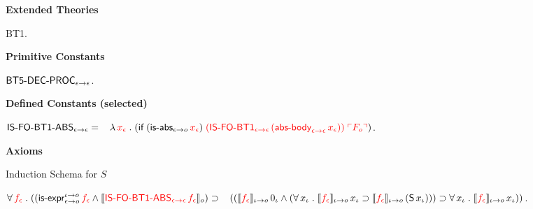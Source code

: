 \begin{biformthy}\em

\bi

  \item[]

  \item[] \textbf{Extended Theories} 

  \be

    \setcounter{enumi}{0}

    \item BT1.

  \ee

  \item[] \textbf{Primitive Constants}

  \be

    \setcounter{enumi}{6}

    \item $\mbox{\sf BT5-DEC-PROC}_{\epsilon \rightarrow \epsilon}$.

  \ee

  \item[] \textbf{Defined Constants (selected)}

  \be

    \setcounter{enumi}{5}

    \item $\mbox{\sf IS-FO-BT1-ABS}_{\epsilon \rightarrow \epsilon} = {}\\
    \hspace*{2ex}\lambda\, \textcolor{red}{x_\epsilon} \mathrel. 
    (\mbox{\sf if} \; (\mbox{\sf is-abs}_{\epsilon \rightarrow o} \, \textcolor{red}{x_\epsilon}) \;
    \textcolor{red}{(\mbox{\sf IS-FO-BT1}_{\epsilon \rightarrow \epsilon} \,
    (\mbox{\sf abs-body}_{\epsilon \rightarrow \epsilon} \, x_\epsilon))} \;
    \textcolor{red}{\ulcorner F_o\urcorner})$.

  \ee

  \item[] \textbf{Axioms}

  \be

    \setcounter{enumi}{26}

    \item Induction Schema for $S$

    $\forall\, \textcolor{red}{f_\epsilon} \mathrel. 
    ((\mbox{\sf is-expr}_{\epsilon \rightarrow o}^{\iota \rightarrow o} \, \textcolor{red}{f_\epsilon} \wedge
    \llbracket\textcolor{red}{\mbox{\sf IS-FO-BT1-ABS}_{\epsilon \rightarrow \epsilon} \, 
    f_\epsilon}\rrbracket_o) \supset {} \\
    \hspace*{2ex}((\llbracket\textcolor{red}{f_\epsilon}\rrbracket_{\iota \rightarrow o} \, 0_\iota \wedge
    (\forall\, x_\iota \mathrel. 
    \llbracket\textcolor{red}{f_\epsilon}\rrbracket_{\iota \rightarrow o} \, x_\iota \supset
    \llbracket\textcolor{red}{f_\epsilon}\rrbracket_{\iota \rightarrow o} \, 
    (\mbox{\sf S} \, x_\iota))) \supset 
    \forall\, x_\iota \mathrel. 
    \llbracket\textcolor{red}{f_\epsilon}\rrbracket_{\iota \rightarrow o} \, x_\iota))$.


\end{biformthy}
